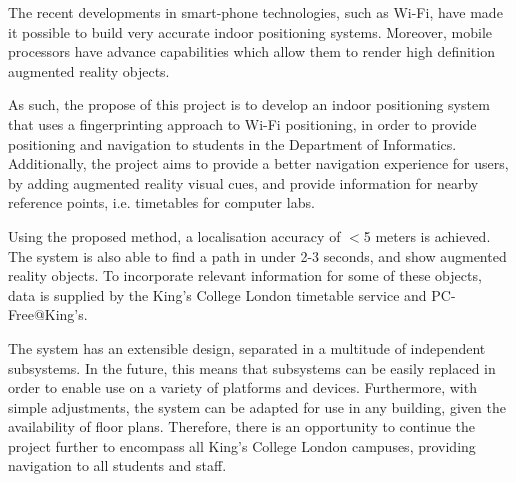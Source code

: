 The recent developments in smart-phone technologies, such as Wi-Fi, have made it possible to build very accurate indoor positioning systems. Moreover, mobile processors have advance capabilities which allow them to render high definition augmented reality objects. 

As such, the propose of this project is to develop an indoor positioning system that uses a fingerprinting approach to Wi-Fi positioning, in order to provide positioning and navigation to students in the Department of Informatics. Additionally, the project aims to provide a better navigation experience for users, by adding augmented reality visual cues, and provide information for nearby reference points, i.e. timetables for computer labs.

Using the proposed method, a localisation accuracy of $<$5 meters is achieved. The system is also able to find a path in under 2-3 seconds, and show augmented reality objects. To incorporate relevant information for some of these objects, data is supplied by the King's College London timetable service and PC-Free@King's. 

The system has an extensible design, separated in a multitude of independent subsystems. In the future, this means that subsystems can be easily replaced in order to enable use on a variety of platforms and devices. Furthermore, with simple adjustments, the system can be adapted for use in any building, given the availability of floor plans. Therefore, there is an opportunity to continue the project further to encompass all King's College London campuses, providing navigation to all students and staff.